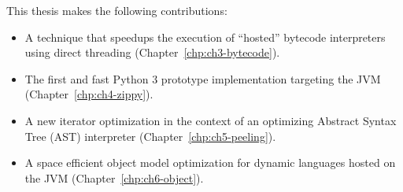 This thesis makes the following contributions:
\begin{itemize}

\item A technique that speedups the execution of ``hosted'' bytecode interpreters using direct threading (Chapter~\ref{chp:ch3-bytecode}).

\item The first and fast Python 3 prototype implementation targeting the JVM (Chapter~\ref{chp:ch4-zippy}).

\item A new iterator optimization in the context of an optimizing Abstract Syntax Tree (AST) interpreter (Chapter~\ref{chp:ch5-peeling}).

\item A space efficient object model optimization for dynamic languages hosted on the JVM (Chapter~\ref{chp:ch6-object}).

\end{itemize}